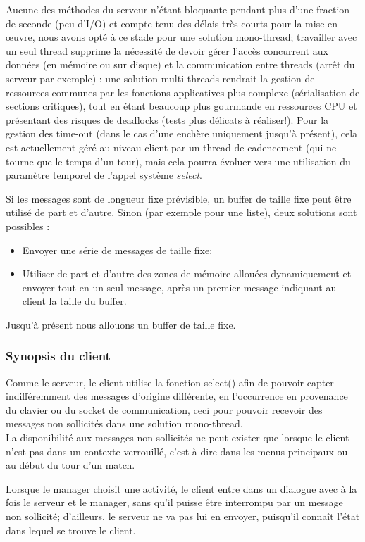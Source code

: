 \documentclass[a4paper,titlepage]{scrreprt}
\begin{document}
Aucune des méthodes du serveur n'étant bloquante pendant plus d'une fraction de seconde (peu d'I/O) et compte tenu des délais très courts pour la mise en œuvre, nous avons opté à ce stade pour une solution mono-thread;
travailler avec un seul thread supprime la nécessité de devoir gérer l'accès concurrent aux données (en mémoire ou sur disque) et la communication entre threads (arrêt du serveur par exemple) :
une solution multi-threads rendrait la gestion de ressources communes par les fonctions applicatives plus complexe (sérialisation de sections critiques), 
tout en étant beaucoup plus gourmande en ressources CPU et présentant des risques de deadlocks (tests plus délicats à réaliser!). 
Pour la gestion des time-out (dans le cas d'une enchère uniquement jusqu'à présent), 
cela est actuellement géré au niveau client par un thread de cadencement (qui ne tourne que le temps d'un tour),
mais cela pourra évoluer vers une utilisation du paramètre temporel de l'appel système \emph{select}.

Si les messages sont de longueur fixe prévisible, un buffer de taille fixe peut être utilisé de part et d'autre.
Sinon (par exemple pour une liste), deux solutions sont possibles :
\begin{itemize}
  \item Envoyer une série de messages de taille fixe;
  \item Utiliser de part et d'autre des zones de mémoire allouées dynamiquement et envoyer tout en un seul message, après un premier message indiquant au client la taille du buffer.
\end{itemize}
Jusqu'à présent nous allouons un buffer de taille fixe.

  \subsubsection{Synopsis du client}
Comme le serveur, le client utilise la fonction select() afin de pouvoir capter indifféremment des messages d'origine différente,
 en l’occurrence en provenance du clavier ou du socket de communication, ceci pour pouvoir recevoir des messages non sollicités dans une solution mono-thread.\\
 La disponibilité aux messages non sollicités ne peut exister que lorsque le client
 n'est pas dans un contexte verrouillé, c'est-à-dire dans les menus principaux ou au début du tour d'un match.
 
 Lorsque le manager choisit une activité, le client entre dans un dialogue avec à la fois le serveur et le manager,
 sans qu'il puisse être interrompu par un message non sollicité; d'ailleurs, le serveur ne va pas lui en envoyer,
 puisqu'il connaît l'état dans lequel se trouve le client.
 
\end{document}
